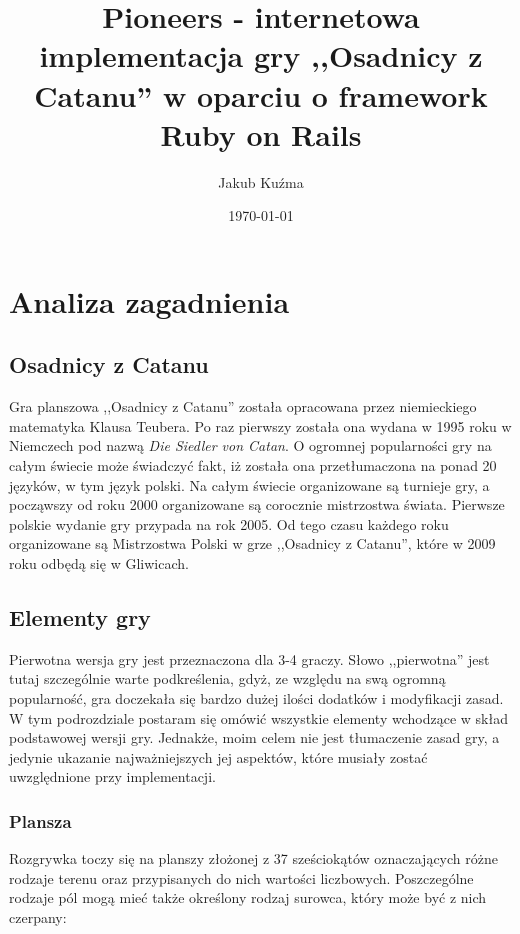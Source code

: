 \documentclass[a4paper,12pt]{article}
\begin{document}
\author{Jakub Kuźma}
\title{Pioneers - internetowa implementacja gry ,,Osadnicy z Catanu''
  w oparciu o framework Ruby on Rails}
\date{\today}

\begin{titlepage}
\maketitle
\end{titlepage}

\tableofcontents

\clearpage

\section{Analiza zagadnienia}

\subsection{Osadnicy z Catanu}
Gra planszowa ,,Osadnicy z Catanu'' została opracowana przez
niemieckiego matematyka Klausa Teubera. Po raz pierwszy została ona
wydana w 1995 roku w Niemczech pod nazwą \emph{Die Siedler von
  Catan}. O ogromnej popularności gry na całym świecie może świadczyć
fakt, iż została ona przetłumaczona na ponad 20 języków, w tym język
polski. Na całym świecie organizowane są turnieje gry, a począwszy od
roku 2000 organizowane są corocznie mistrzostwa świata. Pierwsze
polskie wydanie gry przypada na rok 2005. Od tego czasu każdego roku
organizowane są Mistrzostwa Polski w grze ,,Osadnicy z Catanu'', które
w 2009 roku odbędą się w Gliwicach.

\subsection{Elementy gry}
Pierwotna wersja gry jest przeznaczona dla 3-4 graczy. Słowo
,,pierwotna'' jest tutaj szczególnie warte podkreślenia, gdyż, ze
względu na swą ogromną popularność, gra doczekała się bardzo dużej
ilości dodatków i modyfikacji zasad. W tym podrozdziale postaram się
omówić wszystkie elementy wchodzące w skład podstawowej wersji
gry. Jednakże, moim celem nie jest tłumaczenie zasad gry, a jedynie
ukazanie najważniejszych jej aspektów, które musiały zostać
uwzględnione przy implementacji.

\subsubsection{Plansza}
Rozgrywka toczy się na planszy złożonej z 37 sześciokątów
oznaczających różne rodzaje terenu oraz przypisanych do nich wartości
liczbowych. Poszczególne rodzaje pól mogą mieć także określony rodzaj
surowca, który może być z nich czerpany:
\end{document}

